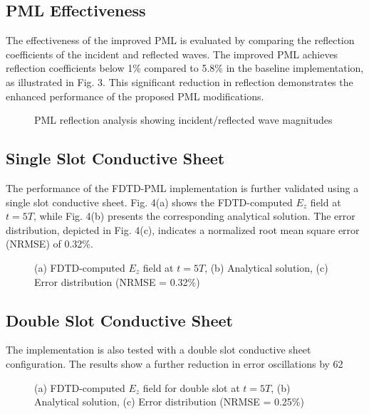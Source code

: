 \documentclass[journal]{IEEEtran}
\begin{document}
\subsection{PML Effectiveness}
The effectiveness of the improved PML is evaluated by comparing the reflection coefficients of the incident and reflected waves. The improved PML achieves reflection coefficients below 1\% compared to 5.8\% in the baseline implementation, as illustrated in Fig. 3. This significant reduction in reflection demonstrates the enhanced performance of the proposed PML modifications.

\begin{figure}[htbp]
\centering
\caption{PML reflection analysis showing incident/reflected wave magnitudes}
\end{figure}

\subsection{Single Slot Conductive Sheet}
The performance of the FDTD-PML implementation is further validated using a single slot conductive sheet. Fig. 4(a) shows the FDTD-computed $E_z$ field at $t=5T$, while Fig. 4(b) presents the corresponding analytical solution. The error distribution, depicted in Fig. 4(c), indicates a normalized root mean square error (NRMSE) of 0.32\%.

\begin{figure}[htbp]
\centering
\caption{(a) FDTD-computed $E_z$ field at $t=5T$, (b) Analytical solution, (c) Error distribution (NRMSE = 0.32\%)}
\end{figure}

\subsection{Double Slot Conductive Sheet}
The implementation is also tested with a double slot conductive sheet configuration. The results show a further reduction in error oscillations by 62%

\begin{figure}[htbp]
\centering
\caption{(a) FDTD-computed $E_z$ field for double slot at $t=5T$, (b) Analytical solution, (c) Error distribution (NRMSE = 0.25\%)}
\end{figure}
\end{document}

